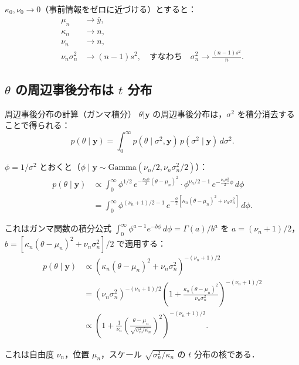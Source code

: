 \documentclass[lualatex,ja=standard,a4paper,12pt]{bxjsarticle}
\begin{document}
$\kappa_0, \nu_0 \to 0$（事前情報をゼロに近づける）とすると：
\begin{align*}
  \mu_n &\to \bar{y}, \\
  \kappa_n &\to n, \\
  \nu_n &\to n, \\
  \nu_n\sigma_n^2 &\to (n-1)s^2,
  \quad \text{すなわち} \quad
  \sigma_n^2 \to \frac{(n-1)s^2}{n}.
\end{align*}

\subsection{$\theta$ の周辺事後分布は $t$ 分布}

\begin{derivbox}{周辺事後分布の計算（ガンマ積分）}
$\theta|\mathbf{y}$ の周辺事後分布は，$\sigma^2$ を積分消去することで得られる：
\[
  p(\theta \mid \mathbf{y})
  = \int_0^\infty p(\theta \mid \sigma^2, \mathbf{y})\, p(\sigma^2 \mid \mathbf{y})\, d\sigma^2.
\]

$\phi = 1/\sigma^2$ とおくと（$\phi \mid \mathbf{y} \sim \mathrm{Gamma}(\nu_n/2, \nu_n\sigma_n^2/2)$）：
\begin{align*}
  p(\theta \mid \mathbf{y})
  &\propto \int_0^\infty \phi^{1/2}\, e^{-\frac{\kappa_n\phi}{2}(\theta-\mu_n)^2}
    \cdot \phi^{\nu_n/2-1}\, e^{-\frac{\nu_n\sigma_n^2}{2}\phi}\, d\phi \\
  &= \int_0^\infty \phi^{(\nu_n+1)/2-1}\,
     e^{-\frac{\phi}{2}\left[\kappa_n(\theta-\mu_n)^2 + \nu_n\sigma_n^2\right]}\, d\phi.
\end{align*}

これはガンマ関数の積分公式
$\displaystyle\int_0^\infty \phi^{a-1} e^{-b\phi}\, d\phi = \Gamma(a)/b^a$
を $a = (\nu_n+1)/2$，$b = \left[\kappa_n(\theta-\mu_n)^2 + \nu_n\sigma_n^2\right]/2$ で適用する：
\begin{align*}
  p(\theta \mid \mathbf{y})
  &\propto \left(\kappa_n(\theta-\mu_n)^2 + \nu_n\sigma_n^2\right)^{-(\nu_n+1)/2} \\
  &= \left(\nu_n\sigma_n^2\right)^{-(\nu_n+1)/2}
     \left(1 + \frac{\kappa_n(\theta-\mu_n)^2}{\nu_n\sigma_n^2}\right)^{-(\nu_n+1)/2} \\
  &\propto \left(1 + \frac{1}{\nu_n}
     \left(\frac{\theta-\mu_n}{\sqrt{\sigma_n^2/\kappa_n}}\right)^2
    \right)^{-(\nu_n+1)/2}.
\end{align*}

これは自由度 $\nu_n$，位置 $\mu_n$，スケール $\sqrt{\sigma_n^2/\kappa_n}$ の $t$ 分布の核である．
\end{derivbox}
\end{document}
